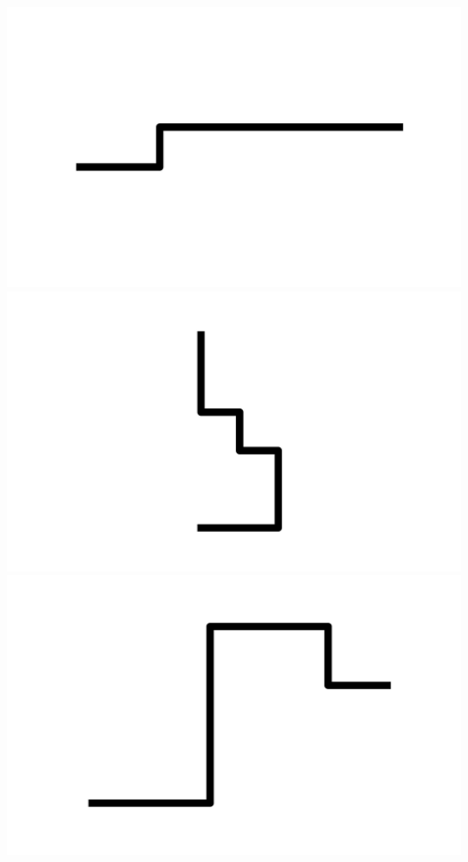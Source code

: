 \documentclass[]{report}
\begin{document}
\includegraphics[scale=.1]{pictures/21/state_cluster_shapes_85.pdf} 
\includegraphics[scale=.1]{pictures/21/state_cluster_shapes_86.pdf} 
\includegraphics[scale=.1]{pictures/21/state_cluster_shapes_87.pdf} 
\end{document}
